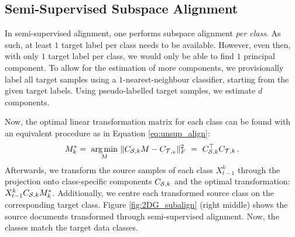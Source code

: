 \documentclass[letterpaper]{article} %
\begin{document}
\subsection{Semi-Supervised Subspace Alignment}
In semi-supervised alignment, one performs subspace alignment \textit{per class}. As such, at least $1$ target label per class needs to be available. However, even then, with only $1$ target label per class, we would only be able to find $1$ principal component. To allow for the estimation of more components, we provisionally label all target samples using a $1$-nearest-neighbour classifier, starting from the given target labels. Using pseudo-labelled target samples, we estimate $d$ components.

Now, the optimal linear transformation matrix for each class can be found with an equivalent procedure as in Equation \ref{eq:unsup_align}:
\begin{align}
    M_{k}^{*} = \ \underset{M}{\arg \min} \ \| C_{{\cal S}, k} M - C_{{\cal T},_k} \|^{2}_{F} \ = \ C_{{\cal S},k}^{\top} C_{{\cal T},k} \label{eq:semisup_align} \, .
\end{align}
Afterwards, we transform the source samples of each class $X_{t-1}^k$ through the projection onto class-specific components $C_{{\cal S},k}$ and the optimal transformation: $X_{t-1}^{k} C_{{\cal S}, k} M_{k}^{*}$. Additionally, we centre each transformed source class on the corresponding target class. Figure \ref{fig:2DG_subalign} (right middle) shows the source documents transformed through semi-supervised alignment. Now, the classes match the target data classes.

\end{document}
